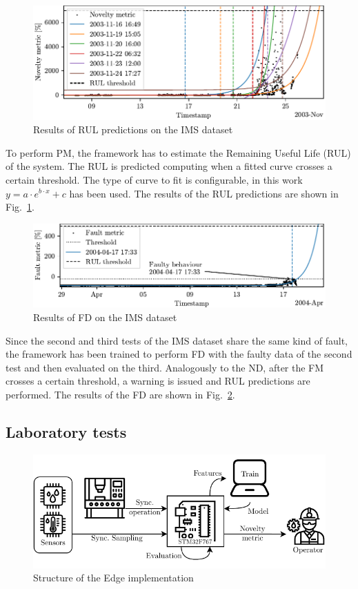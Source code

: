 \begin{figure}
    \includegraphics[width=\linewidth]{images/RUL_IMS.pdf}
    \caption{Results of RUL predictions on the IMS dataset}
    \label{fig:RUL_IMS}
\end{figure}
To perform PM, the framework has to estimate the Remaining Useful Life (RUL) of the system. The RUL is predicted computing when a fitted curve crosses a certain threshold. The type of curve to fit is configurable, in this work $y = a \cdot e^{b \cdot x} + c$ has been used. The results of the RUL predictions are shown in Fig.~\ref{fig:RUL_IMS}.

\begin{figure}
    \includegraphics[width=\linewidth]{images/FD_IMS.pdf}
    \caption{Results of FD on the IMS dataset}
    \label{fig:FD_IMS}
\end{figure}
Since the second and third tests of the IMS dataset share the same kind of fault, the framework has been trained to perform FD with the faulty data of the second test and then evaluated on the third. Analogously to the ND, after the FM crosses a certain threshold, a warning is issued and RUL predictions are performed. The results of the FD are shown in Fig.~\ref{fig:FD_IMS}.

\subsection{Laboratory tests}

\begin{figure}
    \includegraphics[width=\linewidth]{images/EmbeddedStructure.pdf}
    \caption{Structure of the Edge implementation}
    \label{fig:embedded}
\end{figure}


